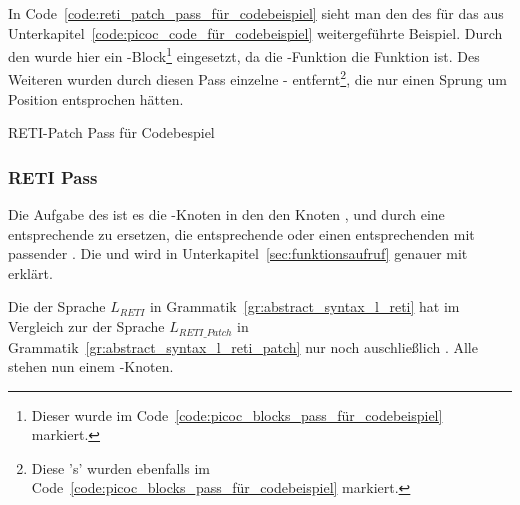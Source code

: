 
In Code~\ref{code:reti_patch_pass_für_codebeispiel} sieht man den  des  für das aus Unterkapitel~\ref{code:picoc_code_für_codebeispiel} weitergeführte Beispiel. Durch den  wurde hier ein -Block\footnote{Dieser  wurde im Code~\ref{code:picoc_blocks_pass_für_codebeispiel} markiert.} eingesetzt, da die -Funktion  die  Funktion ist. Des Weiteren wurden durch diesen Pass einzelne - entfernt\footnote{Diese  's' wurden ebenfalls im Code~\ref{code:picoc_blocks_pass_für_codebeispiel} markiert.}, die nur einen Sprung um  Position entsprochen hätten.

\begin{code}
  \centering
  \caption{RETI-Patch Pass für Codebespiel}
  \label{code:reti_patch_pass_für_codebeispiel}
\end{code}

\subsubsection{RETI Pass}
\label{reti_pass}

\label{sec:reti_pass_zweck}

Die Aufgabe des  ist es die -Knoten in den den Knoten ,  und  durch eine entsprechende  zu ersetzen, die entsprechende  oder einen entsprechenden  mit passender  . Die  und  wird in Unterkapitel~\ref{sec:funktionsaufruf} genauer mit  erklärt.


Die  der Sprache $L_{RETI}$ in Grammatik~\ref{gr:abstract_syntax_l_reti} hat im Vergleich zur  der Sprache $L_{RETI\_Patch}$ in Grammatik~\ref{gr:abstract_syntax_l_reti_patch} nur noch auschließlich . Alle  stehen nun einem -Knoten.

